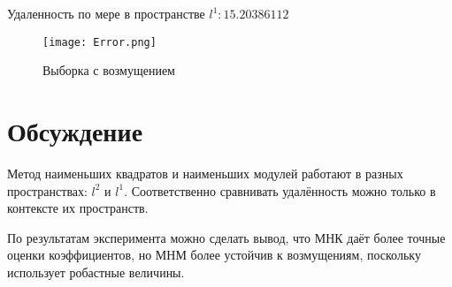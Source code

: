 \documentclass[12pt,a4paper]{article}
\begin{document}
Удаленность по мере в пространстве $l^1:15.20386112$
\begin{figure}[H]
    \centering
    \texttt{[image: Error.png]}
    \caption{Выборка с возмущением}
\end{figure}

\section{Обсуждение}
Метод наименьших квадратов и наименьших модулей работают в разных пространствах: $l^2$ и $l^1$. Соответственно сравнивать удалённость можно только в контексте их пространств.

По результатам эксперимента можно сделать вывод, что МНК даёт более точные оценки коэффициентов, но МНМ более устойчив к возмущениям, поскольку использует робастные величины.
\end{document}
